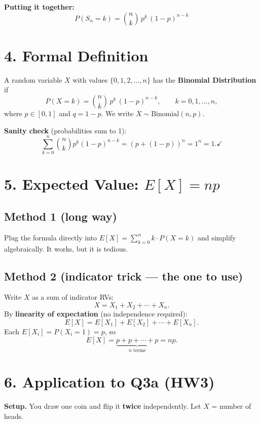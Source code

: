 \documentclass[12pt]{article}
\begin{document}
\textbf{Putting it together:}
\[
\boxed{P(S_n = k) = \binom{n}{k}\, p^k\,(1-p)^{n-k}}
\]

\section*{4. Formal Definition}

A random variable $X$ with values $\{0, 1, 2, \ldots, n\}$ has the \textbf{Binomial Distribution} if
\[
P(X = k) = \binom{n}{k}\, p^k\,(1-p)^{n-k}, \qquad k = 0, 1, \ldots, n,
\]
where $p \in [0,1]$ and $q = 1-p$. We write $X \sim \mathrm{Binomial}(n, p)$.

\textbf{Sanity check} (probabilities sum to 1):
\[
\sum_{k=0}^{n} \binom{n}{k} p^k (1-p)^{n-k} = (p + (1-p))^n = 1^n = 1. \checkmark
\]

\section*{5. Expected Value: $E[X] = np$}

\subsection*{Method 1 (long way)}

Plug the formula directly into $E[X] = \sum_{k=0}^{n} k \cdot P(X = k)$ and simplify algebraically. It works, but it is tedious.

\subsection*{Method 2 (indicator trick --- the one to use)}

Write $X$ as a sum of indicator RVs:
\[
X = X_1 + X_2 + \cdots + X_n.
\]
By \textbf{linearity of expectation} (no independence required):
\[
E[X] = E[X_1] + E[X_2] + \cdots + E[X_n].
\]
Each $E[X_i] = P(X_i = 1) = p$, so
\[
\boxed{E[X] = \underbrace{p + p + \cdots + p}_{n \text{ terms}} = np.}
\]

\section*{6. Application to Q3a (HW3)}

\textbf{Setup.} You draw one coin and flip it \textbf{twice} independently. Let $X$ = number of heads.
\end{document}
